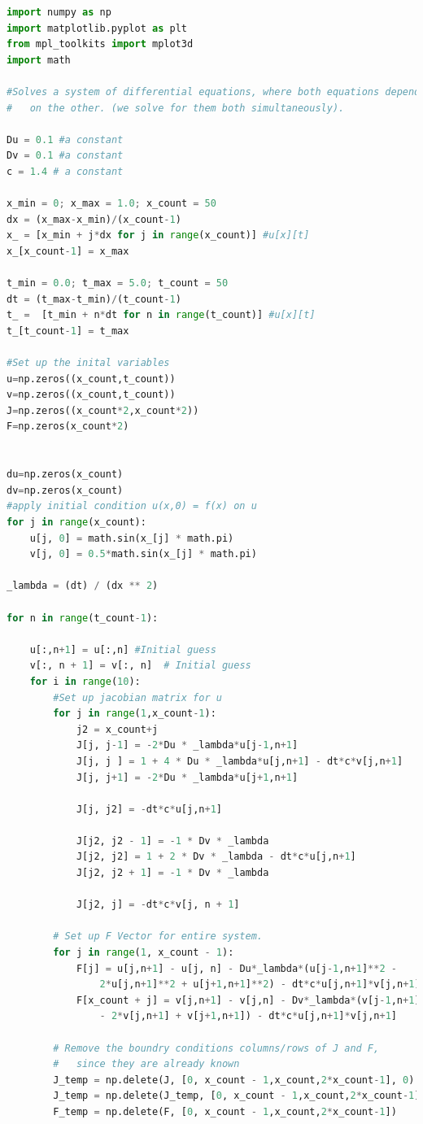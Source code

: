 \documentclass[11pt]{article}
\begin{document}
\begin{lstlisting}[language=Python]
import numpy as np
import matplotlib.pyplot as plt
from mpl_toolkits import mplot3d
import math

#Solves a system of differential equations, where both equations depend
#   on the other. (we solve for them both simultaneously).

Du = 0.1 #a constant
Dv = 0.1 #a constant
c = 1.4 # a constant

x_min = 0; x_max = 1.0; x_count = 50
dx = (x_max-x_min)/(x_count-1)
x_ = [x_min + j*dx for j in range(x_count)] #u[x][t]
x_[x_count-1] = x_max

t_min = 0.0; t_max = 5.0; t_count = 50
dt = (t_max-t_min)/(t_count-1)
t_ =  [t_min + n*dt for n in range(t_count)] #u[x][t]
t_[t_count-1] = t_max

#Set up the inital variables
u=np.zeros((x_count,t_count))
v=np.zeros((x_count,t_count))
J=np.zeros((x_count*2,x_count*2))
F=np.zeros(x_count*2)


du=np.zeros(x_count)
dv=np.zeros(x_count)
#apply initial condition u(x,0) = f(x) on u
for j in range(x_count):
    u[j, 0] = math.sin(x_[j] * math.pi)
    v[j, 0] = 0.5*math.sin(x_[j] * math.pi)

_lambda = (dt) / (dx ** 2)

for n in range(t_count-1):

    u[:,n+1] = u[:,n] #Initial guess
    v[:, n + 1] = v[:, n]  # Initial guess
    for i in range(10):
        #Set up jacobian matrix for u
        for j in range(1,x_count-1):
            j2 = x_count+j
            J[j, j-1] = -2*Du * _lambda*u[j-1,n+1]
            J[j, j ] = 1 + 4 * Du * _lambda*u[j,n+1] - dt*c*v[j,n+1]
            J[j, j+1] = -2*Du * _lambda*u[j+1,n+1]

            J[j, j2] = -dt*c*u[j,n+1]

            J[j2, j2 - 1] = -1 * Dv * _lambda
            J[j2, j2] = 1 + 2 * Dv * _lambda - dt*c*u[j,n+1]
            J[j2, j2 + 1] = -1 * Dv * _lambda

            J[j2, j] = -dt*c*v[j, n + 1]

        # Set up F Vector for entire system.
        for j in range(1, x_count - 1):
            F[j] = u[j,n+1] - u[j, n] - Du*_lambda*(u[j-1,n+1]**2 -
                2*u[j,n+1]**2 + u[j+1,n+1]**2) - dt*c*u[j,n+1]*v[j,n+1]
            F[x_count + j] = v[j,n+1] - v[j,n] - Dv*_lambda*(v[j-1,n+1]
                - 2*v[j,n+1] + v[j+1,n+1]) - dt*c*u[j,n+1]*v[j,n+1]

        # Remove the boundry conditions columns/rows of J and F, 
        #   since they are already known
        J_temp = np.delete(J, [0, x_count - 1,x_count,2*x_count-1], 0)
        J_temp = np.delete(J_temp, [0, x_count - 1,x_count,2*x_count-1], 1)
        F_temp = np.delete(F, [0, x_count - 1,x_count,2*x_count-1])



\end{lstlisting}
\end{document}
